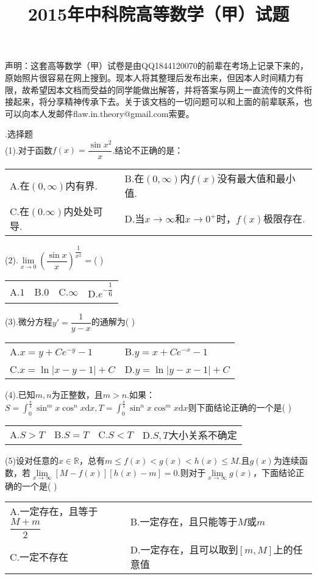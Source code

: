 \documentclass[UTF8]{ctexart}
\date{}
\author{}
\begin{document}
\title{2015年中科院高等数学（甲）试题}
\maketitle
\thispagestyle{empty}
声明：这套高等数学（甲）试卷是由QQ1844120070的前辈在考场上记录下来的，原始照片很容易在网上搜到。现本人将其整理后发布出来，但因本人时间精力有限，故希望因本文档而受益的同学能做出解答，并将答案与网上一直流传的文件衔接起来，将分享精神传承下去。关于该文档的一切问题可以和上面的前辈联系，也可以向本人发邮件flaw.in.theory@gmail.com索要。


.选择题\\
(1).对于函数$ f(x)=\dfrac{\sin{x^2}}{x} $.结论不正确的是：\\
\begin{tabular}{ll}
	A.在$ (0,\infty) $内有界.&
	B.在$ (0,\infty) $内$ f(x) $没有最大值和最小值.\\
	C.在$ (0.\infty) $内处处可导.&
	D.当$ x\rightarrow\infty $和$ x\rightarrow0^+ $时，$ f(x) $极限存在.
\end{tabular}


\noindent(2).$ \lim\limits_{x\rightarrow0}(\dfrac{\sin{x}}{x})^{\dfrac{1}{x^2}} = $(	)\\
\begin{tabular}{llll}
	A.$ 1 $& B.$ 0 $& C.$ \infty $& D.$ e^{-\dfrac{1}{6}} $
\end{tabular}


\noindent(3).微分方程$ y'=\dfrac{1}{y-x} $的通解为(	)\\
\begin{tabular}{ll}
	A.$ x=y+Ce^{-y}-1 $&
	B.$ y=x+Ce^{-x}-1 $\\
	C.$ x=\ln\left|x-y-1\right|+C $&
	D.$ y=\ln\left|y-x-1\right|+C$
\end{tabular}


\noindent(4).已知$ m,n $为正整数，且$ m>n $.如果：$ S=\int_{0}^{\frac{\pi}{4}}\sin^m{x}\cos^n{x}\mathrm{d}x,T=\int_{0}^{\frac{\pi}{4}}\sin^n{x}\cos^m{x}\mathrm{d}x $则下面结论正确的一个是(	)\\
\begin{tabular}{llll}
	A.$ S>T $& B.$ S=T $& C.$ S<T $& D.$ S,T $大小关系不确定
\end{tabular}


\noindent(5)设对任意的$ x\in\mathbb{R} $，总有$ m\le f(x)<g(x)<h(x)\le M $.且$ g(x) $为连续函数，若$ \lim\limits_{x\rightarrow\infty}[M-f(x)][h(x)-m]=0. $则对于$ \lim\limits_{x\rightarrow\infty}g(x) $，下面结论正确的一个是(	)\\
\begin{tabular}{ll}
	A.一定存在，且等于$ \dfrac{M+m}{2} $&
	B.一定存在，且只能等于$ M $或$ m $\\
	C.一定不存在&
	D.一定存在，且可以取到$ [m,M] $上的任意值
\end{tabular}
\end{document}

